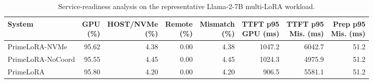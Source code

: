 \begin{table}[t]
\centering
\caption{Service-readiness analysis on the representative Llama-2-7B multi-LoRA workload.}
\label{tab:service_readiness}
\setlength{\tabcolsep}{2.4pt}
\renewcommand{\arraystretch}{1.10}
\begin{tabular}{lrrrrrrr}
\hline
System & \shortstack{GPU\\(\%)} & \shortstack{HOST/NVMe\\(\%)} & \shortstack{Remote\\(\%)} & \shortstack{Mismatch\\(\%)} & \shortstack{TTFT p95\\GPU (ms)} & \shortstack{TTFT p95\\Mis. (ms)} & \shortstack{Prep p95\\Mis. (ms)} \\
\hline
PrimeLoRA-NVMe & 95.62 & 4.38 & 0.00 & 4.38 & 1047.2 & 6042.7 & 51.2 \\
PrimeLoRA-NoCoord & 95.55 & 4.45 & 0.00 & 4.45 & 1024.3 & 4975.9 & 51.2 \\
PrimeLoRA & 95.80 & 4.20 & 0.00 & 4.20 & 906.5 & 5581.1 & 51.2 \\
\hline
\end{tabular}
\end{table}
